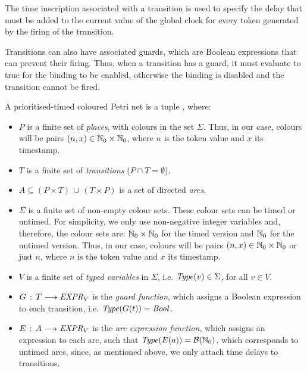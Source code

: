 The time inscription associated with a transition 
is used to specify the delay that must be added to the
current value of the global clock for
every token generated by the firing of the transition.

Transitions can also have associated guards, which
are Boolean expressions that can prevent their firing.
Thus, when a transition has a guard, it must evaluate to
true for the binding to be enabled,
otherwise the binding is disabled and 
the transition cannot be fired. 

\begin{definition} 
A prioritised-timed coloured Petri net is a tuple \ptcpntuple, where: %
\begin{itemize}
\item $P$ is a finite set of {\em places}, with colours
in the set $\Sigma$. Thus, in our case, colours 
will be pairs $(n,x)\in \mathbb{N}_{0} \times \mathbb{N}_{0}$, where $n$ is
the token value and $x$ its timestamp.
%
\item $T$ is a finite set of {\em transitions} ($P\cap T = \emptyset$).
%
\item $A \subseteq (P\times T)\,\cup\,(T \times P)$ is a
set of directed {\em arcs}.
%
\item $\Sigma$ is a finite set of non-empty colour sets. These colour sets can be timed or untimed. For simplicity,
we only use non-negative integer variables and, therefore, the colour sets are: 
$\mathbb{N}_{0} \times \mathbb{N}_{0}$ for the timed version and $\mathbb{N}_{0}$ for the untimed version. Thus, in our case, colours 
will be pairs $(n,x)\in \mathbb{N}_{0} \times \mathbb{N}_{0}$ or just $n$, where $n$ is
the token value and $x$ its timestamp.
%
\item $V$ is a finite set of {\em typed variables} in $\Sigma$, 
i.e. ${\it Type}(v) \in \Sigma$, for all $v \in V$.
%
%
\item $G\,:\, T \longrightarrow {\it EXPR}_V$ is the
{\em guard function}, which assigns a Boolean
expression
to each transition, i.e. ${\it Type}(G(t))={\it Bool}$. 
%
\item $E\,:\, A \longrightarrow {\it EXPR}_V$ is the
{\em arc expression function}, which assigns an expression
to each arc, such that ${\it Type}(E(a)) = {\cal B}(\mathbb{N}_{0})$,
which corresponds to untimed arcs, since, as mentioned above,
we only attach time delays to transitions.


\end{itemize}
\end{definition}
